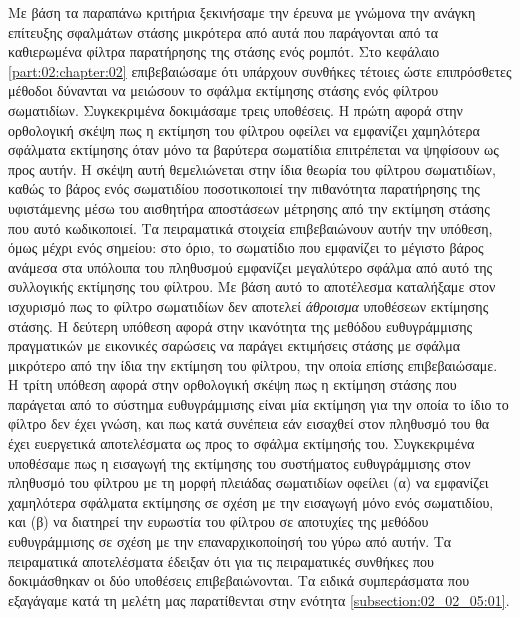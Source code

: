 Με βάση τα παραπάνω κριτήρια ξεκινήσαμε την έρευνα με γνώμονα την ανάγκη
επίτευξης σφαλμάτων στάσης μικρότερα από αυτά που παράγονται από τα καθιερωμένα
φίλτρα παρατήρησης της στάσης ενός ρομπότ. Στο κεφάλαιο
\ref{part:02:chapter:02} επιβεβαιώσαμε ότι υπάρχουν συνθήκες τέτοιες ώστε
επιπρόσθετες μέθοδοι δύνανται να μειώσουν το σφάλμα εκτίμησης στάσης ενός
φίλτρου σωματιδίων. Συγκεκριμένα δοκιμάσαμε τρεις υποθέσεις. Η πρώτη αφορά στην
ορθολογική σκέψη πως η εκτίμηση του φίλτρου οφείλει να εμφανίζει χαμηλότερα
σφάλματα εκτίμησης όταν μόνο τα βαρύτερα σωματίδια επιτρέπεται να ψηφίσουν ως
προς αυτήν. Η σκέψη αυτή θεμελιώνεται στην ίδια θεωρία του φίλτρου σωματιδίων,
καθώς το βάρος ενός σωματιδίου ποσοτικοποιεί την πιθανότητα παρατήρησης της
υφιστάμενης μέσω του αισθητήρα αποστάσεων μέτρησης από την εκτίμηση στάσης που
αυτό κωδικοποιεί. Τα πειραματικά στοιχεία επιβεβαιώνουν αυτήν την υπόθεση, όμως
μέχρι ενός σημείου: στο όριο, το σωματίδιο που εμφανίζει το μέγιστο βάρος
ανάμεσα στα υπόλοιπα του πληθυσμού εμφανίζει μεγαλύτερο σφάλμα από αυτό της
συλλογικής εκτίμησης του φίλτρου. Με βάση αυτό το αποτέλεσμα καταλήξαμε στον
ισχυρισμό πως το φίλτρο σωματιδίων δεν αποτελεί \textit{άθροισμα} υποθέσεων
εκτίμησης στάσης. Η δεύτερη υπόθεση αφορά στην ικανότητα της μεθόδου
ευθυγράμμισης πραγματικών με εικονικές σαρώσεις να παράγει εκτιμήσεις στάσης με
σφάλμα μικρότερο από την ίδια την εκτίμηση του φίλτρου, την οποία επίσης
επιβεβαιώσαμε. Η τρίτη υπόθεση αφορά στην ορθολογική σκέψη πως η εκτίμηση
στάσης που παράγεται από το σύστημα ευθυγράμμισης είναι μία εκτίμηση για την
οποία το ίδιο το φίλτρο δεν έχει γνώση, και πως κατά συνέπεια εάν εισαχθεί στον
πληθυσμό του θα έχει ευεργετικά αποτελέσματα ως προς το σφάλμα εκτίμησής του.
Συγκεκριμένα υποθέσαμε πως η εισαγωγή της εκτίμησης του συστήματος
ευθυγράμμισης στον πληθυσμό του φίλτρου με τη μορφή πλειάδας σωματιδίων οφείλει
(α) να εμφανίζει χαμηλότερα σφάλματα εκτίμησης σε σχέση με την εισαγωγή μόνο
ενός σωματιδίου, και (β) να διατηρεί την ευρωστία του φίλτρου σε αποτυχίες της
μεθόδου ευθυγράμμισης σε σχέση με την επαναρχικοποίησή του γύρω από αυτήν. Τα
πειραματικά αποτελέσματα έδειξαν ότι για τις πειραματικές συνθήκες που
δοκιμάσθηκαν οι δύο υποθέσεις επιβεβαιώνονται. Τα ειδικά συμπεράσματα που
εξαγάγαμε κατά τη μελέτη μας παρατίθενται στην ενότητα
\ref{subsection:02_02_05:01}.


